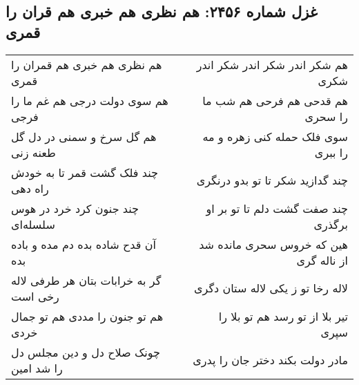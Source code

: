 \begin{center}
\section*{غزل شماره ۲۴۵۶: هم نظری هم خبری هم قران را قمری}
\label{sec:2456}
\begin{longtable}{l p{0.5cm} r}
هم نظری هم خبری هم قمران را قمری
&&
هم شکر اندر شکر اندر شکر اندر شکری
\\
هم سوی دولت درجی هم غم ما را فرجی
&&
هم قدحی هم فرحی هم شب ما را سحری
\\
هم گل سرخ و سمنی در دل گل طعنه زنی
&&
سوی فلک حمله کنی زهره و مه را ببری
\\
چند فلک گشت قمر تا به خودش راه دهی
&&
چند گدازید شکر تا تو بدو درنگری
\\
چند جنون کرد خرد در هوس سلسله‌ای
&&
چند صفت گشت دلم تا تو بر او برگذری
\\
آن قدح شاده بده دم مده و باده بده
&&
هین که خروس سحری مانده شد از ناله گری
\\
گر به خرابات بتان هر طرفی لاله رخی است
&&
لاله رخا تو ز یکی لاله ستان دگری
\\
هم تو جنون را مددی هم تو جمال خردی
&&
تیر بلا از تو رسد هم تو بلا را سپری
\\
چونک صلاح دل و دین مجلس دل را شد امین
&&
مادر دولت بکند دختر جان را پدری
\\
\end{longtable}
\end{center}
